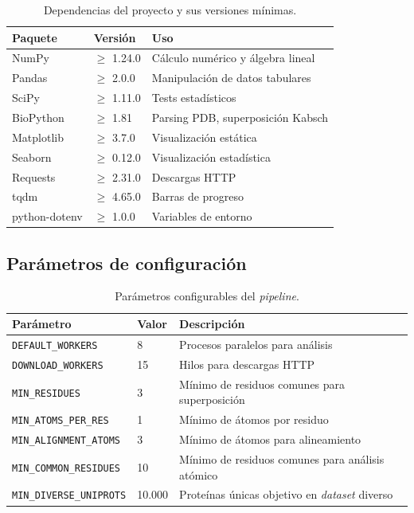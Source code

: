 \begin{table}[H]
\centering
\caption{Dependencias del proyecto y sus versiones m\'inimas.}
\label{tab:dependencies}
\begin{tabular}{@{}lll@{}}
\toprule
\textbf{Paquete} & \textbf{Versi\'on} & \textbf{Uso} \\
\midrule
NumPy & $\geq$ 1.24.0 & C\'alculo num\'erico y \'algebra lineal \\
Pandas & $\geq$ 2.0.0 & Manipulaci\'on de datos tabulares \\
SciPy & $\geq$ 1.11.0 & Tests estad\'isticos \\
BioPython & $\geq$ 1.81 & Parsing PDB, superposici\'on Kabsch \\
Matplotlib & $\geq$ 3.7.0 & Visualizaci\'on est\'atica \\
Seaborn & $\geq$ 0.12.0 & Visualizaci\'on estad\'istica \\
Requests & $\geq$ 2.31.0 & Descargas HTTP \\
tqdm & $\geq$ 4.65.0 & Barras de progreso \\
python-dotenv & $\geq$ 1.0.0 & Variables de entorno \\
\bottomrule
\end{tabular}
\end{table}

\subsection{Par\'ametros de configuraci\'on}

\begin{table}[H]
\centering
\caption{Par\'ametros configurables del \textit{pipeline}.}
\label{tab:params}
\begin{tabular}{@{}llp{7cm}@{}}
\toprule
\textbf{Par\'ametro} & \textbf{Valor} & \textbf{Descripci\'on} \\
\midrule
\texttt{DEFAULT\_WORKERS} & 8 & Procesos paralelos para an\'alisis \\
\texttt{DOWNLOAD\_WORKERS} & 15 & Hilos para descargas HTTP \\
\texttt{MIN\_RESIDUES} & 3 & M\'inimo de residuos comunes para superposici\'on \\
\texttt{MIN\_ATOMS\_PER\_RES} & 1 & M\'inimo de \'atomos por residuo \\
\texttt{MIN\_ALIGNMENT\_ATOMS} & 3 & M\'inimo de \'atomos para alineamiento \\
\texttt{MIN\_COMMON\_RESIDUES} & 10 & M\'inimo de residuos comunes para an\'alisis at\'omico \\
\texttt{MIN\_DIVERSE\_UNIPROTS} & 10.000 & Prote\'inas \'unicas objetivo en \textit{dataset} diverso \\
\bottomrule
\end{tabular}
\end{table}


